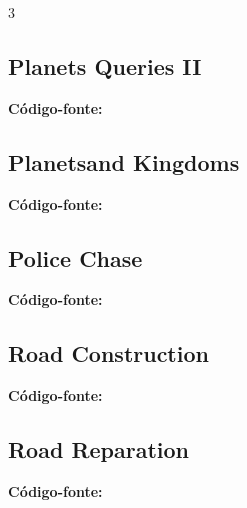 \documentclass[8pt]{extarticle}
\begin{document}
\begin{multicols*}{3}
\subsection{Planets Queries II}
\begin{caixaenunciado}

\end{caixaenunciado}
\vspace{0.3cm}
\noindent\textbf{Código-fonte:}


\subsection{Planetsand Kingdoms}
\begin{caixaenunciado}

\end{caixaenunciado}
\vspace{0.3cm}
\noindent\textbf{Código-fonte:}


\subsection{Police Chase}
\begin{caixaenunciado}

\end{caixaenunciado}
\vspace{0.3cm}
\noindent\textbf{Código-fonte:}


\subsection{Road Construction}
\begin{caixaenunciado}

\end{caixaenunciado}
\vspace{0.3cm}
\noindent\textbf{Código-fonte:}


\subsection{Road Reparation}
\begin{caixaenunciado}

\end{caixaenunciado}
\vspace{0.3cm}
\noindent\textbf{Código-fonte:}



\end{multicols*}
\end{document}
